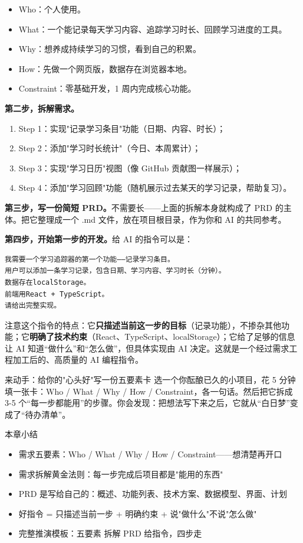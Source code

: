 \begin{itemize}
  \item Who：个人使用。
  \item What：一个能记录每天学习内容、追踪学习时长、回顾学习进度的工具。
  \item Why：想养成持续学习的习惯，看到自己的积累。
  \item How：先做一个网页版，数据存在浏览器本地。
  \item Constraint：零基础开发，1 周内完成核心功能。
\end{itemize}

\textbf{第二步，拆解需求。}

\begin{enumerate}
  \item Step 1：实现"记录学习条目"功能（日期、内容、时长）；
  \item Step 2：添加"学习时长统计"（今日、本周累计）；
  \item Step 3：实现"学习日历"视图（像 GitHub 贡献图一样展示）；
  \item Step 4：添加"学习回顾"功能（随机展示过去某天的学习记录，帮助复习）。
\end{enumerate}

\textbf{第三步，写一份简短 PRD。}不需要长——上面的拆解本身就构成了 PRD 的主体。把它整理成一个 .md 文件，放在项目根目录，作为你和 AI 的共同参考。

\textbf{第四步，开始第一步的开发。}给 AI 的指令可以是：

\begin{lstlisting}
我需要一个学习追踪器的第一个功能——记录学习条目。
用户可以添加一条学习记录，包含日期、学习内容、学习时长（分钟）。
数据存在localStorage。
前端用React + TypeScript。
请给出完整实现。
\end{lstlisting}

注意这个指令的特点：它\textbf{只描述当前这一步的目标}（记录功能），不掺杂其他功能；它\textbf{明确了技术约束}（React、TypeScript、localStorage）；它给了足够的信息让 AI 知道“做什么”和“怎么做”，但具体实现由 AI 决定。这就是一个经过需求工程加工后的、高质量的 AI 编程指令。

\begin{tcbpractice}{来动手：给你的"心头好"写一份五要素卡}
选一个你酝酿已久的小项目，花 5 分钟填一张卡：Who / What / Why / How / Constraint，各一句话。然后把它拆成 3-5 个“每一步都能用”的步骤。你会发现：把想法写下来之后，它就从“白日梦”变成了“待办清单”。

\end{tcbpractice}

\begin{tcbsummary}{本章小结}
\begin{itemize}
  \item 需求五要素：Who / What / Why / How / Constraint——想清楚再开口
  \item 需求拆解黄金法则：每一步完成后项目都是"能用的东西"
  \item PRD 是写给自己的：概述、功能列表、技术方案、数据模型、界面、计划
  \item 好指令 = 只描述当前一步 + 明确约束 + 说"做什么"不说"怎么做"
  \item 完整推演模板：五要素 拆解 PRD 给指令，四步走
\end{itemize}

\end{tcbsummary}
